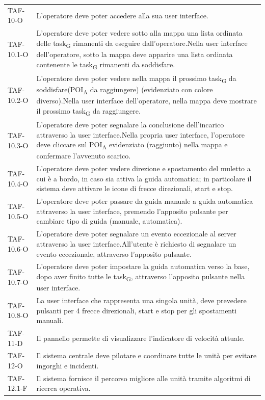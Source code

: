 \begin{longtable}{ >{\centering}p{} >{}p{}}
	TAF-10-O & L'operatore deve poter accedere alla sua user interface.\tabularnewline

	TAF-10.1-O & L'operatore deve poter vedere sotto alla mappa una lista ordinata delle task\textsubscript{G} rimanenti da eseguire dall'operatore.\newline Nella user interface dell'operatore, sotto la mappa deve apparire una lista ordinata contenente le task\textsubscript{G} rimanenti da soddisfare.\tabularnewline
	TAF-10.2-O & L'operatore deve poter vedere nella mappa il prossimo task\textsubscript{G} da soddisfare(POI\textsubscript{A} da raggiungere) (evidenziato con colore diverso).\newline Nella user interface dell'operatore, nella mappa deve mostrare il prossimo task\textsubscript{G} da raggiungere.\tabularnewline
	TAF-10.3-O & L'operatore deve poter segnalare la conclusione dell'incarico attraverso la user interface.\newline Nella propria user interface, l'operatore deve cliccare sul POI\textsubscript{A} evidenziato (raggiunto) nella mappa e confermare l'avvenuto scarico.\tabularnewline
	TAF-10.4-O & L'operatore deve poter vedere direzione e spostamento del muletto a cui è a bordo, in caso sia attiva la guida automatica; in particolare il sistema deve attivare le icone di frecce direzionali, start e stop. \tabularnewline
	TAF-10.5-O & L'operatore deve poter passare da guida manuale a guida automatica attraverso la user interface, premendo l'apposito pulsante per cambiare tipo di guida (manuale, automatica).\tabularnewline
	TAF-10.6-O & L'operatore deve poter segnalare un evento eccezionale al server attraverso la user interface.\newline All'utente è richiesto di segnalare un evento eccezionale, attraverso l'apposito pulsante.\tabularnewline
	TAF-10.7-O & L'operatore deve poter impostare la guida automatica verso la base, dopo aver finito tutte le task\textsubscript{G}, attraverso l'apposito pulsante nella user interface.\tabularnewline
	TAF-10.8-O & La user interface che rappresenta una singola unità, deve prevedere pulsanti per 4 frecce direzionali, start e stop per gli spostamenti manuali.\tabularnewline

	TAF-11-D & Il pannello permette di visualizzare l'indicatore di velocità attuale.\tabularnewline

	TAF-12-O & Il sistema centrale deve pilotare e coordinare tutte le unità per evitare ingorghi e incidenti.\tabularnewline
	TAF-12.1-F & Il sistema fornisce il percorso migliore alle unità tramite algoritmi di ricerca operativa.\tabularnewline


\end{longtable}
